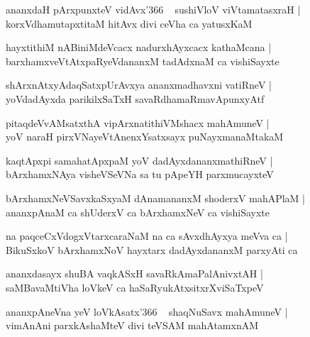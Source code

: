 \documentclass[twoside,12pt,openright]{book}
\newcounter{shloka}[chapter]
\begin{document}
\begin{shloka}%
ananxdaH pArxpunxteV vidAvx\char'366 ~ sushiVloV viVtamatasxraH |\\
korxVdhamutapxtitaM hitAvx divi ceVha ca yatusxKaM 
\end{shloka}

\begin{shloka}%
hayxtithiM nABiniMdeVcacx nadurxhAyxcacx kathaMcana |\\
barxhamxveVtAtxpaRyeVdananxM tadAdxnaM ca vishiSayxte
\end{shloka}

\begin{shloka}%
shArxnAtxyAdaqSatxpUrAvxya ananxmadhavxni vatiRneV |\\
yoVdadAyxda parikilxSaTxH savaRdhamaRmavApunxyAtf
\end{shloka}

\begin{shloka}%
pitaqdeVvAMsatxthA vipArxnatithiVMshacx mahAmuneV |\\
yoV naraH pirxVNayeVtAnenxYsatxsayx puNayxmanaMtakaM
\end{shloka}

\begin{shloka}%
kaqtApxpi samahatApxpaM yoV dadAyxdananxmathiRneV |\\
bArxhamxNAya visheVSeVNa sa tu pApeYH parxmucayxteV 
\end{shloka}

\begin{shloka}%
bArxhamxNeVSavxkaSxyaM dAnamananxM shoderxV mahAPlaM |\\
ananxpAnaM ca shUderxV ca bArxhamxNeV ca vishiSayxte
\end{shloka}

\begin{shloka}%
na paqceCxVdogxVtarxcaraNaM na ca sAvxdhAyxya meVva ca |\\
BikuSxkoV bArxhamxNoV hayxtarx dadAyxdananxM parxyAti ca 
\end{shloka}

\begin{shloka}%
ananxdasayx shuBA vaqkASxH savaRkAmaPalAnivxtAH |\\
saMBavaMtiVha loVkeV ca haSaRyukAtxsitxrXviSaTxpeV 
\end{shloka}

\begin{shloka}%
ananxpAneVna yeV loVkAsatx\char'366 ~ shaqNuSavx mahAmuneV |\\
vimAnAni parxkAshaMteV divi teVSAM mahAtamxnAM
\end{shloka}
\end{document}
